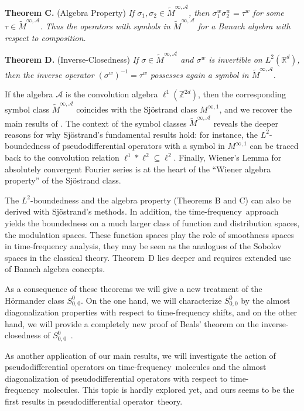 \documentclass[12pt]{amsart}
\theoremstyle{definition}
\theoremstyle{remark}
\numberwithin{equation}{section}
\newcommand{\tfa}{time-frequency analysis}
\newcommand{\tf}{time-frequency}
\newcommand{\tfs}{time-frequency shift}
\newcommand{\modsp}{modulation space}
\newcommand{\psdo}{pseudodifferential operator}
\newcommand{\symbo}{\widetilde M^{\infty, \cA}}
\def\cA{\mathcal{A}}
\def\bR{{\mathbb{R}}}
\def\bZ{{\mathbb{Z}}}
\def\rd{\bR^d}
\def\zdd{{\bZ^{2d}}}
\def\lrd{L^2(\rd)}
\def\inv{^{-1}}
\def\cA{\mathcal{A}}
\begin{document}
\vspace{3 mm}



\textbf{Theorem C.} (Algebra Property) \emph{If $\sigma _1, \sigma _2
  \in \symbo$, then $\sigma _1^w \sigma _2^w = \tau ^w$ for some $\tau
\in \symbo $. Thus the operators with symbols in $\symbo$ for a Banach
algebra with respect to composition. }

\vspace{3 mm}

\textbf{Theorem D.} (Inverse-Closedness) \emph{If $\sigma \in \symbo $
and $\sigma ^w $ is invertible on $\lrd $, then the inverse operator
$(\sigma ^w)\inv = \tau ^w$ possesses again a symbol in $\symbo $. }

\vspace{3 mm}


If the algebra $\cA $ is the convolution algebra $\ell ^1(\zdd )$,
then the corresponding symbol class $\symbo $ coincides with the
Sj\"ostrand class $M^{\infty , 1}$, and we recover the main results of
\cite{Sjo94,Sjo95}. The context of the symbol  classes
$\symbo $ reveals the deeper reasons for why Sj\"ostrand's fundamental
results hold: for instance, the
$L^2$-boundedness of pseudodifferential operators with a symbol in
$M^{\infty ,1}$ can be traced back to the convolution relation $\ell
^1 \ast \ell ^2 \subseteq \ell ^2$. Finally, Wiener's Lemma for
absolutely convergent Fourier series is at the heart of the ``Wiener
algebra property'' of the Sj\"ostrand class. 

The $L^2$-boundedness and the algebra property (Theorems B and C) can
also be derived 
with Sj\"ostrand's methods. In addition, the \tf\ approach yields the
boundedness on a much larger class of function and distribution spaces, the
\modsp s.  These function spaces play the role of smoothness
spaces in \tfa , they may be seen as the analogues of  the Sobolov spaces in the classical
theory. Theorem~D lies deeper and requires 
extended use of Banach algebra concepts. 

As a consequence of these theorems we will give a new treatment of the
H\"ormander class $S^0_{0,0}$. On the one hand, we will characterize
$S^0_{0,0}$ by the almost diagonalization properties with respect to
\tfs s, and on the other hand, we will provide a completely new proof
of Beals' theorem on the inverse-closedness of $S^0_{0,0}$~\cite{beals77}. 


As another application of our main results, we will investigate the
action of \psdo s on \tf\ molecules and the almost diagonalization of
\psdo s with respect to \tf\ molecules. This topic is hardly explored
yet, and ours seems to be the first results in \psdo\ theory. 
\end{document}
